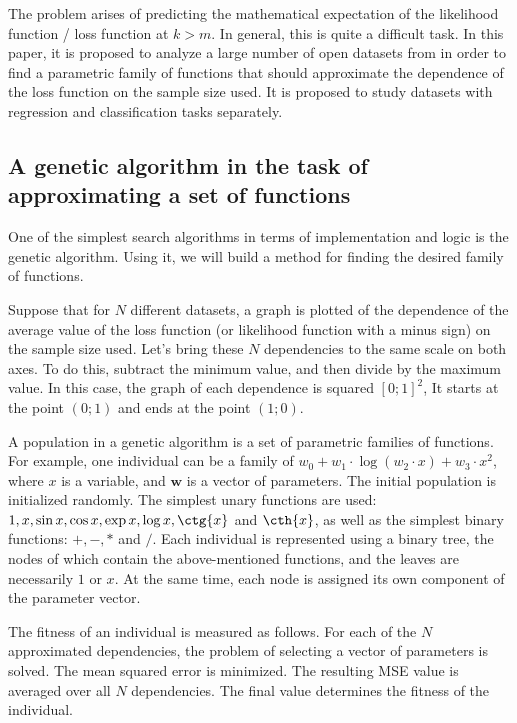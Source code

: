 \documentclass[
11pt,%
tightenlines,%
twoside,%
onecolumn,%
nofloats,%
nobibnotes,%
nofootinbib,%
superscriptaddress,%
noshowpacs,%
centertags]%
{revtex4-2}
\begin{document}
The problem arises of predicting the mathematical expectation of the likelihood function / loss function at $k > m$. In general, this is quite a difficult task. In this paper, it is proposed to analyze a large number of open datasets from \citep{UCI} in order to find a parametric family of functions that should approximate the dependence of the loss function on the sample size used. It is proposed to study datasets with regression and classification tasks separately.

\subsection{A genetic algorithm in the task of approximating a set of functions}\label{ga}

One of the simplest search algorithms in terms of implementation and logic is the genetic algorithm. Using it, we will build a method for finding the desired family of functions. 

Suppose that for $N$ different datasets, a graph is plotted of the dependence of the average value of the loss function (or likelihood function with a minus sign) on the sample size used. Let's bring these $N$ dependencies to the same scale on both axes. To do this, subtract the minimum value, and then divide by the maximum value. In this case, the graph of each dependence is squared $[0; 1]^2$, It starts at the point $(0; 1)$ and ends at the point $(1; 0)$.

A population in a genetic algorithm is a set of parametric families of functions.
For example, one individual can be a family of $w_0 + w_1\cdot\log(w_2\cdot x) + w_3\cdot x^2$, where $x$ is a variable, and $\mathbf{w}$ is a vector of parameters. The initial population is initialized randomly. The simplest unary functions are used: $1, x, \sin{x}, \cos{x}, \exp{x}, \log{x}, \ctg{x}$ and $\cth{x}$, as well as the simplest binary functions: $+, -, *$ and $/$. Each individual is represented using a binary tree, the nodes of which contain the above-mentioned functions, and the leaves are necessarily $1$ or $x$. At the same time, each node is assigned its own component of the parameter vector.

The fitness of an individual is measured as follows. For each of the $N$ approximated dependencies, the problem of selecting a vector of parameters is solved. The mean squared error is minimized. The resulting MSE value is averaged over all $N$ dependencies. The final value determines the fitness of the individual.
\end{document}
